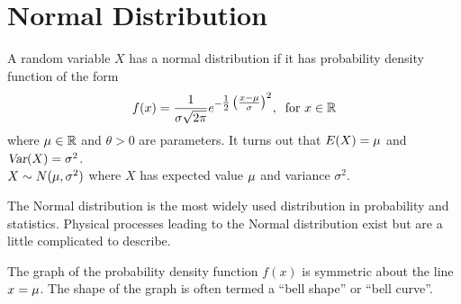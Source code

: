 \section{Normal Distribution}
A random variable $X$ has a normal distribution if it has probability density function of the form
\[
    f(x) = \frac{1}{\sigma\sqrt{2\pi}}
    e^{-\textstyle\frac{1}{2} \left(\frac{x - \mu}{\sigma}\right)^2}
    ,\:\text{ for } x \in \mathbb{R}
\]
where $\mu \in \mathbb{R}$ and $\theta>0$ are parameters. It turns out that $E(X) = \mu$ and $\operatorname{\textsl{Var}}(X) = \sigma^2$. \\
$X \sim N(\mu,\sigma^2)$ where $X$ has expected value $\mu$ and variance $\sigma^2$.
\medskip

The Normal distribution is the most widely used distribution in probability and statistics. Physical
processes leading to the Normal distribution exist but are a little complicated to describe.
\smallskip\par
The graph of the probability density function $f(x)$ is symmetric about the line $x = \mu$. The shape of the graph is often termed a ``bell shape'' or ``bell curve''.
\begin{center}
\end{center}

